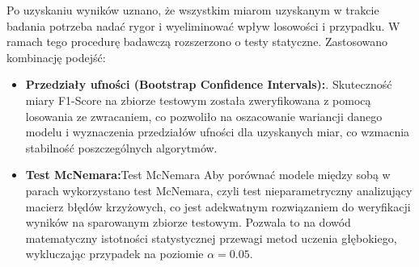 \documentclass[a4paper,twoside,12pt]{book}
\begin{document}
	Po uzyskaniu wyników uznano, że wszystkim miarom uzyskanym w trakcie badania potrzeba nadać rygor i wyeliminować wpływ losowości i przypadku. W ramach tego procedurę badawczą rozszerzono o testy statyczne. Zastosowano kombinację podejść:
	\begin{itemize}
		\item \textbf{Przedziały ufności (Bootstrap Confidence Intervals):}. Skuteczność miary F1-Score na zbiorze testowym została zweryfikowana z pomocą losowania ze zwracaniem, co pozwoliło na oszacowanie wariancji danego modelu i wyznaczenia przedziałów ufności dla uzyskanych miar, co wzmacnia stabilność poszczególnych algorytmów.
		\item \textbf{Test McNemara:}Test McNemara Aby porównać modele między sobą w parach wykorzystano test McNemara, czyli test nieparametryczny analizujący macierz błędów krzyżowych, co jest adekwatnym rozwiązaniem do weryfikacji wyników na sparowanym zbiorze testowym. Pozwala to na dowód matematyczny istotności statystycznej przewagi metod uczenia głębokiego, wykluczając przypadek na poziomie $\alpha = 0.05$.
	\end{itemize}
	
	
\end{document}
